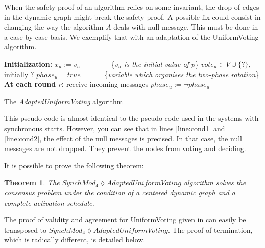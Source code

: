 \documentclass[11pt,letterpaper]{article}
\newtheorem{thm}{Theorem}
\begin{document}
When the safety proof of an algorithm relies on some invariant, the drop of edges in the dynamic graph might break the safety proof.
A possible fix could consist in changing the way the algorithm $A$ deals with null message. This must be done in a case-by-case basis.
We exemplify that with an adaptation of the UniformVoting \cite{CBS09} \cite{Ben83} algorithm.


\begin{algorithm}[htb]
	\DontPrintSemicolon
	\textbf{Initialization:} \;
	\Indp
		$x_u := v_u$ ~~~~~~~~\{\emph{$v_u$ is the initial value of $p$}\} \;
		$vote_u \in V\cup\{ ? \}$, initially $?$ \;
		$phase_u = true$ ~~~~~~\{\textit{variable which organises the two-phase rotation}\} \;
	\BlankLine
	\Indm
	\textbf{At each round $r$:} \;
	\Indp
		receive incoming messages \;
		$phase_u := \neg phase_u$ \;
	\Indm
\caption{The {\em AdaptedUniformVoting} algorithm}
\end{algorithm}

This pseudo-code is almost identical to the pseudo-code used in the systems with synchronous starts.
However, you can see that in lines \ref{line:cond1} and \ref{line:cond2}, the effect of the null messages is precised.
In that case, the null messages are not dropped. They prevent the nodes from voting and deciding.

It is possible to prove the following theorem:

\begin{thm}
	The $SynchMod_4 \lozenge AdaptedUniformVoting$ algorithm solves the consensus problem under the condition of a centered dynamic graph and a complete activation schedule.
\end{thm}

The proof of validity and agreement for UniformVoting given in \cite{CBS09} can easily be transposed to \newline $SynchMod_4 \lozenge AdaptedUniformVoting$.
The proof of termination, which is radically different, is detailed below.
\end{document}
